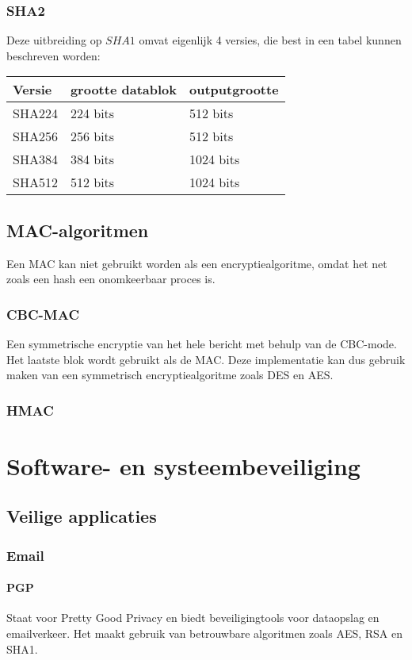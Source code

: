 \documentclass{report}
\begin{document}
	\subsection{SHA2}
	Deze uitbreiding op $SHA1$ omvat eigenlijk 4 versies, die best in een tabel kunnen beschreven worden:
	\begin{table}[ht]
		\centering
		\begin{tabular}{l | l | l}
			Versie & grootte datablok & outputgrootte \\
			\hline
			SHA224 & 224 bits & 512 bits \\
			SHA256 & 256 bits & 512 bits \\
			SHA384 & 384 bits & 1024 bits \\
			SHA512 & 512 bits & 1024 bits \\
		\end{tabular}
	\end{table}


	\section{MAC-algoritmen}
	Een MAC kan niet gebruikt worden als een encryptiealgoritme, omdat het net zoals een hash een onomkeerbaar proces is. 
	\subsection{CBC-MAC}
	Een symmetrische encryptie van het hele bericht met behulp van de CBC-mode. Het laatste blok wordt gebruikt als de MAC. Deze implementatie kan dus gebruik maken van een symmetrisch encryptiealgoritme zoals DES en AES.
	\subsection{HMAC}

	\chapter{Software- en systeembeveiliging}
	\section{Veilige applicaties}
	\subsection{Email}
	\subsubsection{PGP}
	Staat voor Pretty Good Privacy en biedt beveiligingtools voor dataopslag en emailverkeer. Het maakt gebruik van betrouwbare algoritmen zoals AES, RSA en SHA1.
	
\end{document}
